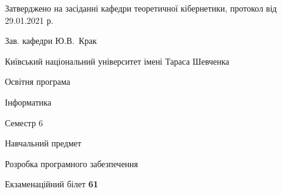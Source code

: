 \documentclass[10pt, ukrainian]{article}
\begin{document}
{\vspace{5mm}\smallskip \begin {small} Затверджено на засіданні кафедри теоретичної кібернетики, протокол  від   29.01.2021 р.\par\smallskip\smallskip
{\parbox {6.5 cm}{Зав. кафедри \dotfill Ю.В.~Крак}} \end{small}}
\newpage

{{\begin {small}\par
{ \center  Київський національний університет імені Тараса Шевченка \par}
{\parbox {5 cm}{Освітня програма \hfill}{\parbox {7 cm}{Інформатика \hfill}}\parbox {6 cm}{\hfill Семестр 6}}\par
{\parbox {5 cm} {Навчальний предмет \hfill}\parbox {7 cm}{Розробка програмного забезпечення \hfill}\parbox {6cm}{\hfill}\par}\vspace{-7pt} \end{small}}{\center Екзаменаційний білет \No \textbf
{ 61 }\par}}
\end{document}

